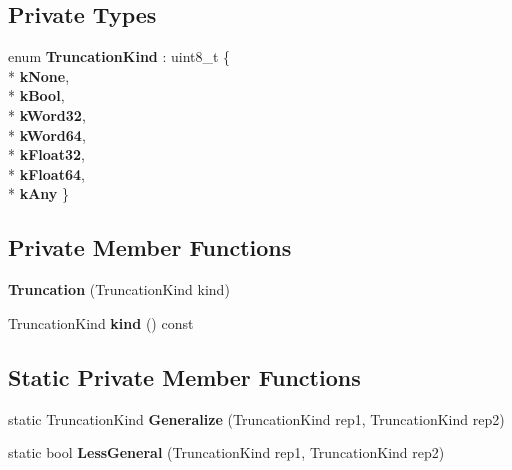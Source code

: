 \subsection*{Private Types}
\begin{DoxyCompactItemize}
\item 
enum {\bfseries Truncation\+Kind} \+: uint8\+\_\+t \{ \\*
{\bfseries k\+None}, 
\\*
{\bfseries k\+Bool}, 
\\*
{\bfseries k\+Word32}, 
\\*
{\bfseries k\+Word64}, 
\\*
{\bfseries k\+Float32}, 
\\*
{\bfseries k\+Float64}, 
\\*
{\bfseries k\+Any}
 \}\hypertarget{classv8_1_1internal_1_1compiler_1_1_truncation_a57e5ae8af5246a16f5069af75ab49a99}{}\label{classv8_1_1internal_1_1compiler_1_1_truncation_a57e5ae8af5246a16f5069af75ab49a99}

\end{DoxyCompactItemize}
\subsection*{Private Member Functions}
\begin{DoxyCompactItemize}
\item 
{\bfseries Truncation} (Truncation\+Kind kind)\hypertarget{classv8_1_1internal_1_1compiler_1_1_truncation_ace0366ac001535e45f617953edef48f4}{}\label{classv8_1_1internal_1_1compiler_1_1_truncation_ace0366ac001535e45f617953edef48f4}

\item 
Truncation\+Kind {\bfseries kind} () const \hypertarget{classv8_1_1internal_1_1compiler_1_1_truncation_a793864a5c20ba62ecc915463345dc970}{}\label{classv8_1_1internal_1_1compiler_1_1_truncation_a793864a5c20ba62ecc915463345dc970}

\end{DoxyCompactItemize}
\subsection*{Static Private Member Functions}
\begin{DoxyCompactItemize}
\item 
static Truncation\+Kind {\bfseries Generalize} (Truncation\+Kind rep1, Truncation\+Kind rep2)\hypertarget{classv8_1_1internal_1_1compiler_1_1_truncation_ab228452a6e82d5fc92e933f1f12569ea}{}\label{classv8_1_1internal_1_1compiler_1_1_truncation_ab228452a6e82d5fc92e933f1f12569ea}

\item 
static bool {\bfseries Less\+General} (Truncation\+Kind rep1, Truncation\+Kind rep2)\hypertarget{classv8_1_1internal_1_1compiler_1_1_truncation_a5eb6ed4cb9e563757c5f1dc597fa5a29}{}\label{classv8_1_1internal_1_1compiler_1_1_truncation_a5eb6ed4cb9e563757c5f1dc597fa5a29}

\end{DoxyCompactItemize}
